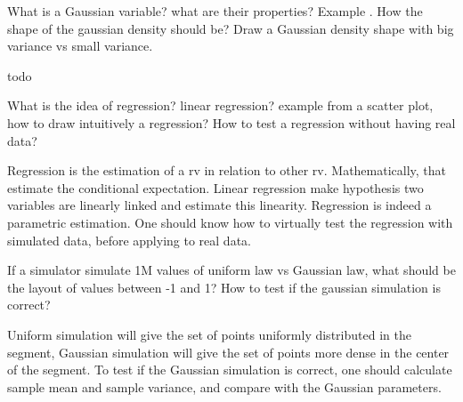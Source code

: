 \documentclass[answers]{exam}
\begin{document}
\begin{questions}
\question What is a Gaussian variable? what are their properties? Example . How the shape of the gaussian density should be?  Draw a Gaussian density shape with big variance vs small variance.
\begin{solution}[.2in]
	todo
\end{solution}

\question What is the idea of regression? linear regression? example from a scatter plot, how to draw intuitively a regression? How to test a regression without having real data?
\begin{solution}[.2in]
Regression is the estimation of a rv in relation to other rv. Mathematically, that estimate the conditional expectation. Linear regression make hypothesis two variables are linearly linked and estimate this linearity. Regression is indeed a parametric estimation. One should know how to virtually test the regression with simulated data, before applying to real data.
\end{solution}

\question If a simulator simulate 1M values of uniform law vs Gaussian law, what should be the layout of values between -1 and 1? How to test if the gaussian simulation is correct?
\begin{solution}[.2in]
Uniform simulation will give the set of points uniformly distributed in the segment, Gaussian simulation will give the set of points more dense in the center of the segment. To test if the Gaussian simulation is correct, one should calculate sample mean and sample variance, and compare with the Gaussian parameters.
\end{solution}
\end{questions}

\newpage
\end{document}
